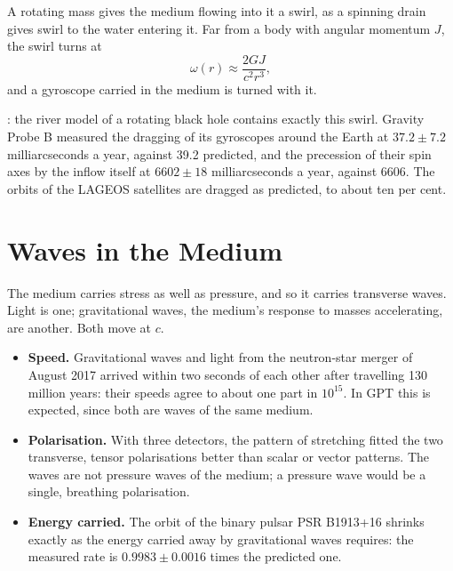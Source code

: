 \documentclass[11pt,a4paper]{article}
\begin{document}
\begin{hypbar}
A rotating mass gives the medium flowing into it a swirl, as a spinning drain gives swirl to the water entering it. Far from a body with angular momentum $J$, the swirl turns at
\begin{equation}
\omega(r) \approx \frac{2GJ}{c^2 r^3},
\end{equation}
and a gyroscope carried in the medium is turned with it.
\end{hypbar}

: the river model of a rotating black hole contains exactly this swirl. Gravity Probe B measured the dragging of its gyroscopes around the Earth at $37.2 \pm 7.2$ milliarcseconds a year, against 39.2 predicted, and the precession of their spin axes by the inflow itself at $6602 \pm 18$ milliarcseconds a year, against 6606. The orbits of the LAGEOS satellites are dragged as predicted, to about ten per cent.

\section{Waves in the Medium}
\label{sec:waves}

\begin{hypbar}
The medium carries stress as well as pressure, and so it carries transverse waves. Light is one; gravitational waves, the medium's response to masses accelerating, are another. Both move at $c$.
\end{hypbar}

\begin{itemize}
\item \textbf{Speed.} Gravitational waves and light from the neutron-star merger of August 2017 arrived within two seconds of each other after travelling 130 million years: their speeds agree to about one part in $10^{15}$. In GPT this is expected, since both are waves of the same medium.
\item \textbf{Polarisation.} With three detectors, the pattern of stretching fitted the two transverse, tensor polarisations better than scalar or vector patterns. The waves are not pressure waves of the medium; a pressure wave would be a single, breathing polarisation.
\item \textbf{Energy carried.} The orbit of the binary pulsar PSR B1913+16 shrinks exactly as the energy carried away by gravitational waves requires: the measured rate is $0.9983 \pm 0.0016$ times the predicted one.
\end{itemize}
\end{document}
